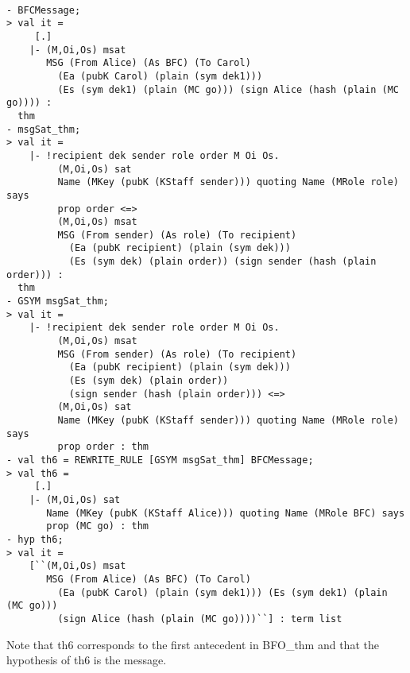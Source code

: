\documentclass[10pt,twoside]{article}
\begin{document}
\begin{session}
  \begin{scriptsize}
\begin{verbatim}

- BFCMessage;
> val it =
     [.]
    |- (M,Oi,Os) msat
       MSG (From Alice) (As BFC) (To Carol)
         (Ea (pubK Carol) (plain (sym dek1)))
         (Es (sym dek1) (plain (MC go))) (sign Alice (hash (plain (MC go)))) :
  thm
- msgSat_thm;
> val it =
    |- !recipient dek sender role order M Oi Os.
         (M,Oi,Os) sat
         Name (MKey (pubK (KStaff sender))) quoting Name (MRole role) says
         prop order <=>
         (M,Oi,Os) msat
         MSG (From sender) (As role) (To recipient)
           (Ea (pubK recipient) (plain (sym dek)))
           (Es (sym dek) (plain order)) (sign sender (hash (plain order))) :
  thm
- GSYM msgSat_thm;
> val it =
    |- !recipient dek sender role order M Oi Os.
         (M,Oi,Os) msat
         MSG (From sender) (As role) (To recipient)
           (Ea (pubK recipient) (plain (sym dek)))
           (Es (sym dek) (plain order))
           (sign sender (hash (plain order))) <=>
         (M,Oi,Os) sat
         Name (MKey (pubK (KStaff sender))) quoting Name (MRole role) says
         prop order : thm
- val th6 = REWRITE_RULE [GSYM msgSat_thm] BFCMessage;
> val th6 =
     [.]
    |- (M,Oi,Os) sat
       Name (MKey (pubK (KStaff Alice))) quoting Name (MRole BFC) says
       prop (MC go) : thm
- hyp th6;
> val it =
    [``(M,Oi,Os) msat
       MSG (From Alice) (As BFC) (To Carol)
         (Ea (pubK Carol) (plain (sym dek1))) (Es (sym dek1) (plain (MC go)))
         (sign Alice (hash (plain (MC go))))``] : term list
\end{verbatim}
  \end{scriptsize}
\end{session}
Note that th6 corresponds to the first antecedent in BFO\_thm and that
the hypothesis of th6 is the message.
\end{document}
